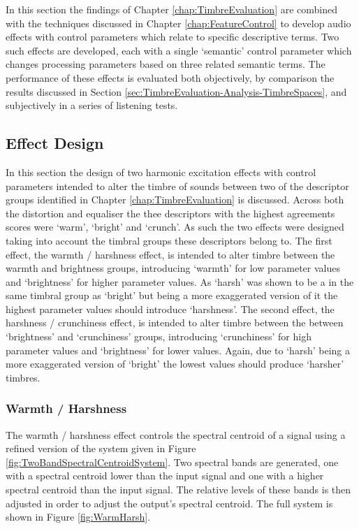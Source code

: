 	In this section the findings of Chapter \ref{chap:TimbreEvaluation} are combined with the techniques discussed in
	Chapter \ref{chap:FeatureControl} to develop audio effects with control parameters which relate to specific
	descriptive terms. Two such effects are developed, each with a single `semantic' control parameter which changes
	processing parameters based on three related semantic terms. The performance of these effects is evaluated both
	objectively, by comparison the results discussed in Section \ref{sec:TimbreEvaluation-Analysis-TimbreSpaces}, and
	subjectively in a series of listening tests.

	\subsection{Effect Design}
	\label{sec:PerceptualExperiments-SemanticControl-EffectDesign}
		In this section the design of two harmonic excitation effects with control parameters intended to alter the
		timbre of sounds between two of the descriptor groups identified in Chapter \ref{chap:TimbreEvaluation} is
		discussed. Across both the distortion and equaliser the thee descriptors with the highest agreements scores
		were `warm', `bright' and `crunch'. As such the two effects were designed taking into account the timbral
		groups these descriptors belong to. The first effect, the warmth / harshness effect, is intended to alter
		timbre between the warmth and brightness groups, introducing `warmth' for low parameter values and
		`brightness' for higher parameter values. As `harsh' was shown to be a in the same timbral group as
		`bright' but being a more exaggerated version of it the highest parameter values should introduce
		`harshness'. The second effect, the harshness / crunchiness effect, is intended to alter timbre between the
		between `brightness' and `crunchiness' groups, introducing `crunchiness' for high parameter values and
		`brightness' for lower values. Again, due to `harsh' being a more exaggerated version of `bright' the
		lowest values should produce `harsher' timbres.

		\subsubsection*{Warmth / Harshness}
			The warmth / harshness effect controls the spectral centroid of a signal using a refined version of
			the system given in Figure \ref{fig:TwoBandSpectralCentroidSystem}. Two spectral bands are
			generated, one with a spectral centroid lower than the input signal and one with a higher spectral
			centroid than the input signal. The relative levels of these bands is then adjusted in order to
			adjust the output's spectral centroid. The full system is shown in Figure \ref{fig:WarmHarsh}.

